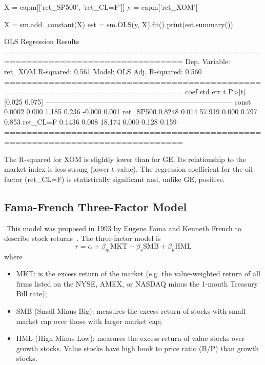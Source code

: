 \begin{ipython}
X = capm[['ret_SP500', 'ret_CL=F']]
y = capm['ret_XOM']

X = sm.add_constant(X)
est = sm.OLS(y, X).fit()
print(est.summary())
\end{ipython} 
\begin{ioutput}
                            OLS Regression Results                            
==============================================================================
Dep. Variable:                ret_XOM   R-squared:                       0.561
Model:                            OLS   Adj. R-squared:                  0.560
==============================================================================
                 coef    std err          t      P>|t|      [0.025      0.975]
------------------------------------------------------------------------------
const          0.0002      0.000      1.185      0.236      -0.000       0.001
ret_SP500      0.8248      0.014     57.919      0.000       0.797       0.853
ret_CL=F       0.1436      0.008     18.174      0.000       0.128       0.159
==============================================================================
\end{ioutput}

The R-squared for XOM is slightly lower than for GE. Its relationship to the market index is less strong (lower t value).
The regression coefficient for the oil factor (ret\_CL=F) is statistically significant and, unlike GE, positive.

\subsection{Fama-French Three-Factor Model}
﻿
This model was proposed in 1993 by Eugene Fama and Kenneth French to describe stock returns~\cite{bib:fama_french}. The three-factor model is
\begin{equation}
r=\alpha + \beta_m \textrm{MKT} +\beta_s \textrm{SMB}+ \beta_h \textrm{HML}
\end{equation}
where
\begin{itemize}
\tightlist
\item MKT: is the excess return of the market (e.g. the value-weighted return of all firms listed on the NYSE, AMEX, or NASDAQ minus the 1-month Treasury Bill rate);
\item SMB (Small Minus Big): measures the excess return of stocks with small market cap over those with larger market cap;
\item HML (High Minus Low): measures the excess return of value stocks over growth stocks. Value stocks have high book to price ratio (B/P) than growth stocks.
\end{itemize}

